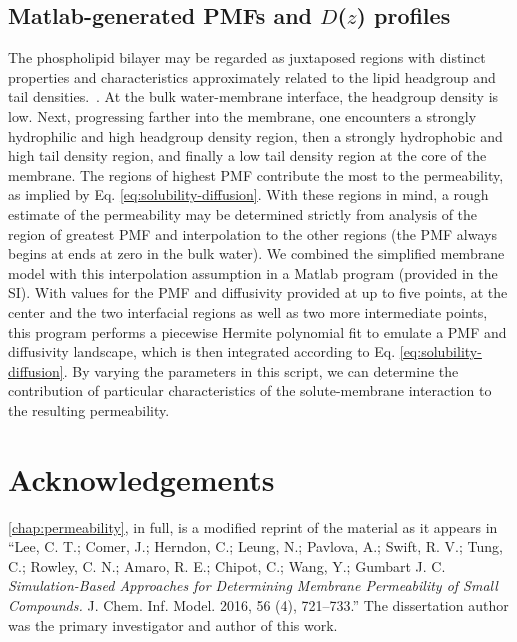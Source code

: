 \subsection{Matlab-generated PMFs and $D$($z$) profiles}
\par The phospholipid bilayer may be regarded as juxtaposed regions with distinct properties and characteristics approximately related to the lipid headgroup and tail densities.~\cite{Marrink1994}. At the bulk water-membrane interface, the headgroup density is low. Next, progressing farther into the membrane, one encounters a strongly hydrophilic and high headgroup density region, then a strongly hydrophobic and high tail density region, and finally a low tail density region at the core of the membrane. The regions of highest PMF contribute the most to the permeability, as implied by Eq. \ref{eq:solubility-diffusion}. With these regions in mind, a rough estimate of the permeability may be determined strictly from analysis of the region of greatest PMF and interpolation to the other regions (the PMF always begins at ends at zero in the bulk water). We combined the simplified membrane model with this interpolation assumption in a Matlab program (provided in the SI). With values for the PMF and diffusivity provided at up to five points, at the center and the two interfacial regions as well as two more intermediate points, this program performs a piecewise Hermite polynomial fit to emulate a PMF and diffusivity landscape, which is then integrated according to Eq. \ref{eq:solubility-diffusion}. By varying the parameters in this script, we can determine the contribution of particular characteristics of the solute-membrane interaction to the resulting permeability.

\section{Acknowledgements}
\par \cref{chap:permeability}, in full, is a modified reprint of the material as it appears in ``Lee, C. T.; Comer, J.; Herndon, C.; Leung, N.; Pavlova, A.; Swift, R. V.; Tung, C.; Rowley, C. N.; Amaro, R. E.; Chipot, C.; Wang, Y.; Gumbart J. C. \emph{Simulation-Based Approaches for Determining Membrane Permeability of Small Compounds.} J. Chem. Inf. Model. 2016, 56 (4), 721–733.''
The dissertation author was the primary investigator and author of this work.

